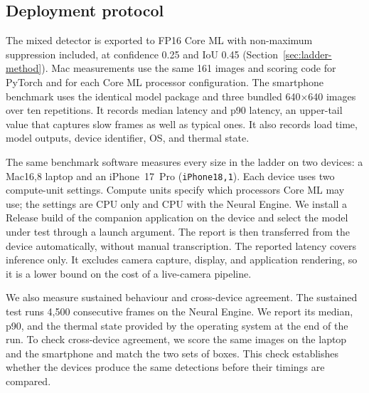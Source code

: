 \subsection{Deployment protocol}

The mixed detector is exported to FP16 Core ML with non-maximum suppression
included, at confidence 0.25 and IoU 0.45 (Section~\ref{sec:ladder-method}). Mac
measurements use the same 161 images and scoring code for PyTorch and for each
Core ML processor configuration. The smartphone benchmark uses the identical
model package and three bundled 640$\times$640 images over ten repetitions. It
records median latency and p90 latency, an upper-tail value that captures slow
frames as well as typical ones. It also records load time, model outputs,
device identifier, OS, and thermal state.

The same benchmark software measures every size in the ladder on two devices: a
Mac16,8 laptop and an iPhone~17~Pro (\texttt{iPhone18,1}). Each device uses two
compute-unit settings. Compute units specify which processors Core ML may use;
the settings are CPU only and CPU with the Neural Engine. We install a Release
build of the companion application on the device and select the model
under test through a launch argument. The report is then transferred from the
device automatically, without manual transcription. The reported latency covers
inference only. It excludes camera capture, display, and application rendering,
so it is a lower bound on the cost of a live-camera pipeline.

We also measure sustained behaviour and cross-device agreement. The sustained
test runs 4{,}500 consecutive frames on the Neural Engine. We report its median,
p90, and the thermal state provided by the operating system at the end of the
run. To check cross-device agreement, we score the same images on the laptop and
the smartphone and match the two sets of boxes. This check establishes whether
the devices produce the same detections before their timings are compared.
